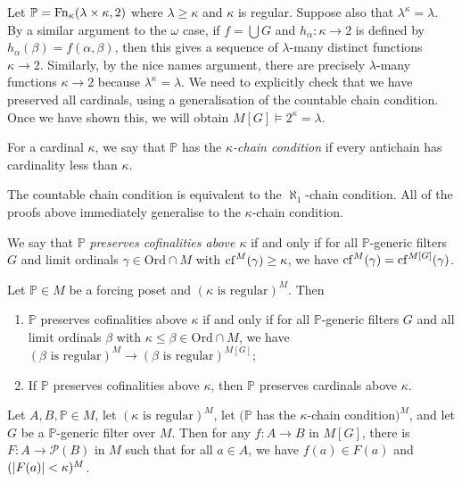 Let \( \mathbb P = \operatorname{Fn}_\kappa(\lambda \times \kappa, 2) \) where \( \lambda \geq \kappa \) and \( \kappa \) is regular.
Suppose also that \( \lambda^\kappa = \lambda \).
By a similar argument to the \( \omega \) case, if \( f = \bigcup G \) and \( h_\alpha : \kappa \to 2 \) is defined by \( h_\alpha(\beta) = f(\alpha, \beta) \), then this gives a sequence of \( \lambda \)-many distinct functions \( \kappa \to 2 \).
Similarly, by the nice names argument, there are precisely \( \lambda \)-many functions \( \kappa \to 2 \) because \( \lambda^\kappa = \lambda \).
We need to explicitly check that we have preserved all cardinals, using a generalisation of the countable chain condition.
Once we have shown this, we will obtain \( M[G] \vDash 2^\kappa = \lambda \).
\begin{definition}
    For a cardinal \( \kappa \), we say that \( \mathbb P \) has the \emph{\( \kappa \)-chain condition} if every antichain has cardinality less than \( \kappa \).
\end{definition}
The countable chain condition is equivalent to the \( \aleph_1 \)-chain condition.
All of the proofs above immediately generalise to the \( \kappa \)-chain condition.
\begin{definition}
    We say that \( \mathbb P \) \emph{preserves cofinalities above \( \kappa \)} if and only if for all \( \mathbb P \)-generic filters \( G \) and limit ordinals \( \gamma \in \mathrm{Ord} \cap M \) with \( \operatorname{cf}^M(\gamma) \geq \kappa \), we have \( \operatorname{cf}^M(\gamma) = \operatorname{cf}^{M[G]}(\gamma) \).
\end{definition}
\begin{lemma}
    Let \( \mathbb P \in M \) be a forcing poset and \( (\kappa \text{ is regular})^M \).
    Then
    \begin{enumerate}
        \item \( \mathbb P \) preserves cofinalities above \( \kappa \) if and only if for all \( \mathbb P \)-generic filters \( G \) and all limit ordinals \( \beta \) with \( \kappa \leq \beta \in \mathrm{Ord} \cap M \), we have \( (\beta \text{ is regular})^M \to (\beta \text{ is regular})^{M[G]} \);
        \item If \( \mathbb P \) preserves cofinalities above \( \kappa \), then \( \mathbb P \) preserves cardinals above \( \kappa \).
    \end{enumerate}
\end{lemma}
\begin{lemma}
    Let \( A, B, \mathbb P \in M \), let \( (\kappa \text{ is regular})^M \), let \( (\mathbb P \) has the \( \kappa \)-chain condition\( )^M \), and let \( G \) be a \( \mathbb P \)-generic filter over \( M \).
    Then for any \( f : A \to B \) in \( M[G] \), there is \( F : A \to \mathcal P(B) \) in \( M \) such that for all \( a \in A \), we have \( f(a) \in F(a) \) and \( (\abs{F(a)} < \kappa)^M \).
\end{lemma}
